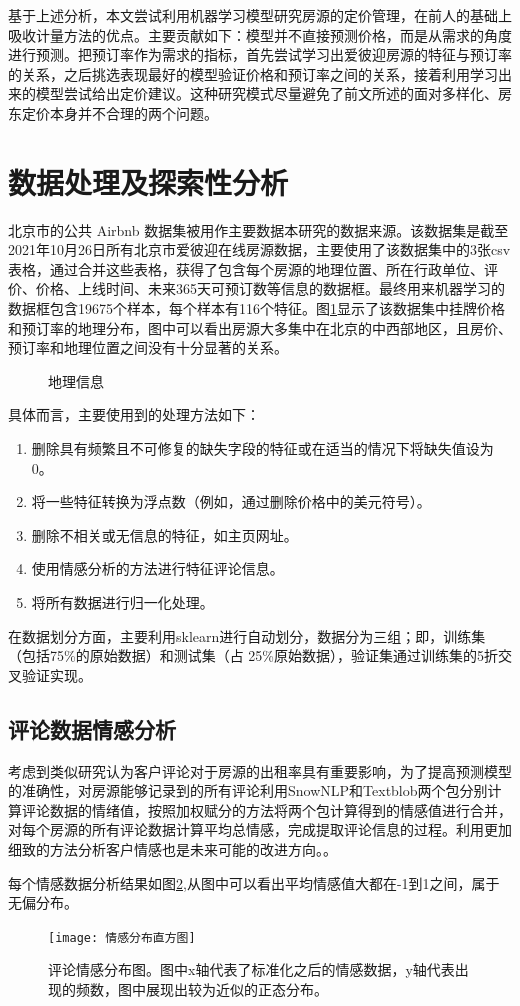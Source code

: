 \documentclass{article}
\begin{document}
\begin{multicols}{2}
\par 基于上述分析，本文尝试利用机器学习模型研究房源的定价管理，在前人的基础上吸收计量方法的优点。主要贡献如下：模型并不直接预测价格，而是从需求的角度进行预测。把预订率作为需求的指标，首先尝试学习出爱彼迎房源的特征与预订率的关系，之后挑选表现最好的模型验证价格和预订率之间的关系，接着利用学习出来的模型尝试给出定价建议。这种研究模式尽量避免了前文所述的面对多样化、房东定价本身并不合理的两个问题。
\section{数据处理及探索性分析}
北京市的公共 Airbnb 数据集被用作主要数据本研究的数据来源。\cite{data-insideairbnb}该数据集是截至2021年10月26日所有北京市爱彼迎在线房源数据，主要使用了该数据集中的3张csv表格，通过合并这些表格，获得了包含每个房源的地理位置、所在行政单位、评价、价格、上线时间、未来365天可预订数等信息的数据框。最终用来机器学习的数据框包含19675个样本，每个样本有116个特征。图\ref{图：房价数据}显示了该数据集中挂牌价格和预订率的地理分布，图中可以看出房源大多集中在北京的中西部地区，且房价、预订率和地理位置之间没有十分显著的关系。
\begin{figure}
	\centering
	\caption{地理信息}
	\label{图：房价数据}
\end{figure}
具体而言，主要使用到的处理方法如下：
\begin{enumerate}
	\item 删除具有频繁且不可修复的缺失字段的特征或在适当的情况下将缺失值设为0。
	\item 将一些特征转换为浮点数（例如，通过删除价格中的美元符号）。
	\item 删除不相关或无信息的特征，如主页网址。
	\item 使用情感分析的方法进行特征评论信息。
	\item 将所有数据进行归一化处理。
\end{enumerate}
\par 在数据划分方面，主要利用sklearn进行自动划分，数据分为三组；即，训练集（包括75\%的原始数据）和测试集（占 25\%原始数据），验证集通过训练集的5折交叉验证实现。
\subsection{评论数据情感分析}
考虑到类似研究认为客户评论对于房源的出租率具有重要影响\cite{Petz2013Jul}，为了提高预测模型的准确性，对房源能够记录到的所有评论利用SnowNLP\cite{snownlp}和Textblob\cite{Ttestblob}两个包分别计算评论数据的情绪值，按照加权赋分的方法将两个包计算得到的情感值进行合并，对每个房源的所有评论数据计算平均总情感，完成提取评论信息的过程。利用更加细致的方法分析客户情感也是未来可能的改进方向。\cite{Petz2013Jul}。
\par 每个情感数据分析结果如图\ref{图：情感分布},从图中可以看出平均情感值大都在-1到1之间，属于无偏分布。
\begin{figure}[H]
	\centering
	\texttt{[image: 情感分布直方图]}
	\label{图：情感分布}
	\caption{评论情感分布图。图中x轴代表了标准化之后的情感数据，y轴代表出现的频数，图中展现出较为近似的正态分布。}
\end{figure}

\end{multicols}
\end{document}
